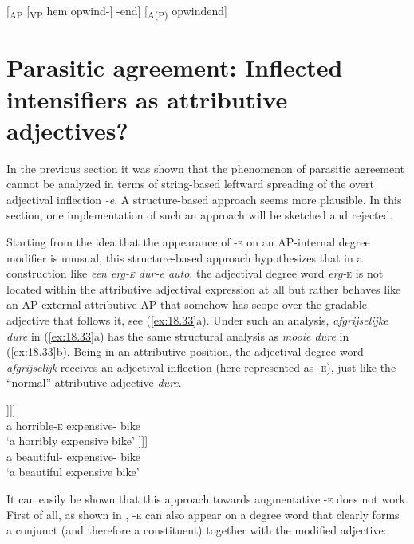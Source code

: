 \documentclass[output=paper]{langsci/langscibook}
\begin{document}
\ea%
    \label{ex:18.32}
    \ea {}[\textsubscript{AP} [\textsubscript{VP} hem opwind-] -end]
	\ex {}[\textsubscript{A(P)} opwindend]
	\z
\z

\section{Parasitic agreement: Inflected intensifiers as attributive
adjectives?}\label{sec:18.6}

In the previous section it was shown that the phenomenon of parasitic agreement
cannot be analyzed in terms of string-based leftward spreading of the overt
adjectival inflection \emph{-e}. A structure-based approach seems more
plausible. In this section, one implementation of such an approach will be
sketched and rejected.

Starting from the idea that the appearance of \textsc{-e} on an AP-internal
degree modifier is unusual, this structure-based approach hypothesizes that in
a construction like \emph{een erg-\textsc{e} dur-e auto}, the adjectival degree
word \emph{erg-}\textsc{e} is not located within the attributive adjectival
expression at all but rather behaves like an AP-external attributive AP that
somehow has scope over the gradable adjective that follows it, see
(\ref{ex:18.33}a). Under such an analysis, \emph{afgrijselijke dure} in
(\ref{ex:18.33}a) has the same structural analysis as \emph{mooie dure} in
(\ref{ex:18.33}b). Being in an attributive position, the adjectival degree word
\emph{afgrijselijk} receives an adjectival inflection (here represented as
\textsc{-e}), just like the \enquote{normal} attributive adjective \emph{dure}.

\ea%
    \label{ex:18.33}
	\ea
	\gll  [\textsubscript{DP} een    [\textsubscript{NP}  afgrijselijk\textsc{-e}    [\textsubscript{NP}  dure              [\textsubscript{NP} fiets ]]]]\\
		{} a  {}                  horrible-\textsc{e}    {}        expensive-\Agr{}  {}    bike\\
	\glt \enquote*{a horribly expensive bike}
	\ex
	\gll  [\textsubscript{DP}  een    [\textsubscript{NP}  mooie        [\textsubscript{NP}  dure                [\textsubscript{NP}  fiets ]]]]\\
		{} a  {}     beautiful-\Agr{}  {}    expensive-\Agr{} {}   bike\\
	\glt \enquote*{a beautiful expensive bike}
	\z
\z

It can easily be shown that this approach towards augmentative \textsc{-e} does
not work. First of all, as shown in , \textsc{-e} can also
appear on a degree word that clearly forms a conjunct (and therefore a
constituent) together with the modified adjective:
\end{document}
